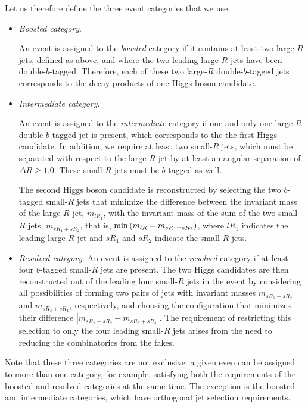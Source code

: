 Let us therefore define the three event categories that
we use:
\begin{itemize}
\item {\it Boosted category}.

  An event is assigned to the {\it boosted} category if it
  contains at least two large-$R$ jets, defined as above,
  and where  the two leading large-$R$ jets have been
   double-$b$-tagged.
 Therefore, each of these two large-$R$ double-$b$-tagged jets corresponds to the
 decay products of one Higgs boson candidate.

\item {\it Intermediate category}.

  An event is assigned to the {\it intermediate} category if
  one and only one large $R$ double-$b$-tagged jet is present,
  which corresponds to the the first Higgs candidate.
  In addition, we require at least two small-$R$ jets,
  which must be separated with respect to the large-$R$
  jet by at least an angular separation of $\Delta R\ge 1.0$.
  These small-$R$ jets must be $b$-tagged as well.

  
  The second Higgs boson candidate is reconstructed
  by selecting the two $b$-tagged small-$R$ jets that minimize the difference
  between the invariant mass of the large-$R$ jet, $m_{lR_1}$,
  with the invariant mass of the sum of the two small-$R$ jets,
  $m_{sR_1+sR_2}$, that is, ${\rm min}\left( m_{lR} -
  m_{sR_1+sR_2}\right)$, where $lR_1$ indicates the leading large-$R$ jet
  and $sR_1$ and $sR_2$ indicate the small-$R$ jets.

\item {\it Resolved category}.
  An event is assigned to the {\it resolved} category
  if at least
  four $b$-tagged small-$R$ jets are present.
  The two Higgs candidates are then reconstructed out of the
  leading four small-$R$ jets in the event
  by considering all possibilities of forming two pairs of jets
  with invariant masses $m_{sR_1+sR_2}$ and 
$m_{sR_3+sR_4}$, respectively, and choosing the configuration that minimizes their difference $|m_{sR_1+sR_2} - m_{sR_3+sR_4}|$. 
  The requirement of restricting this selection to only the four
  leading small-$R$ jets arises from the need to reducing the
  combinatorics from the fakes.
\end{itemize}
Note that these three categories are not exclusive:
a given even can be assigned to more than one category, for
example, satisfying both the requirements of the boosted and resolved
categories at the same time.
%
The exception is the boosted and intermediate categories, which have
orthogonal jet selection requirements.



